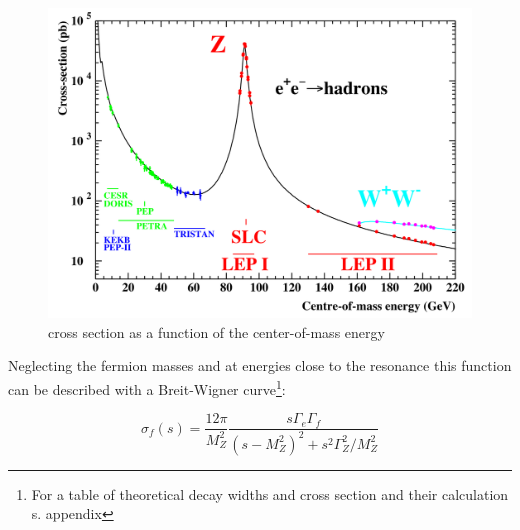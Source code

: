 \begin{figure}[H]
\centering
\includegraphics[width=\linewidth]{graphics/crosssection}
\caption{cross section as a function of the center-of-mass energy\cite{jakobs}}
\label{fig:principles:crosssection}
\end{figure}

 Neglecting the fermion masses and at energies close to the resonance this function can be described with a Breit-Wigner curve\footnote{For a table of theoretical decay widths and cross section and their calculation s. appendix}\cite{muenchen}:
 
\begin{equation}
\sigma_f(s) = \frac{12\pi}{M_Z^2} \frac{s\Gamma_e\Gamma_f}{(s-M_Z^2)^2+s^2\Gamma_Z^2/M_Z^2}
\label{eq:principles:breitwigner}
\end{equation}

